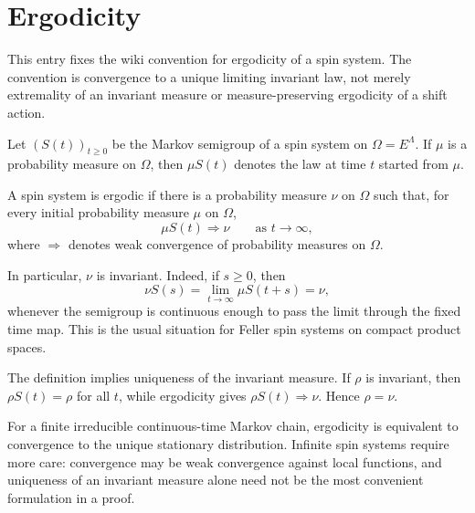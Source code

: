 
\section{Ergodicity}\label{ent:ergodicity}

This entry fixes the wiki convention for ergodicity of a spin system. The convention is convergence to a unique limiting invariant law, not merely extremality of an invariant measure or measure-preserving ergodicity of a shift action.


Let \((S(t))_{t\ge0}\) be the Markov semigroup of a spin system on \(\Omega=E^\Lambda\). If \(\mu\) is a probability measure on \(\Omega\), then \(\mu S(t)\) denotes the law at time \(t\) started from \(\mu\).

\begin{defn}[Ergodicity]\label{def:ergodicity}
A spin system is ergodic if there is a probability measure \(\nu\) on \(\Omega\) such that, for every initial probability measure \(\mu\) on \(\Omega\),
\[
    \mu S(t) \Rightarrow \nu
    \qquad\text{as }t\to\infty,
\]
where \(\Rightarrow\) denotes weak convergence of probability measures on \(\Omega\).
\end{defn}

In particular, \(\nu\) is invariant. Indeed, if \(s\ge0\), then
\[
    \nu S(s)
    =\lim_{t\to\infty} \mu S(t+s)
    =\nu,
\]
whenever the semigroup is continuous enough to pass the limit through the fixed time map. This is the usual situation for Feller spin systems on compact product spaces.

\begin{rem}[Uniqueness]\label{rem:ergodicity-uniqueness}
The definition implies uniqueness of the invariant measure. If \(\rho\) is invariant, then \(\rho S(t)=\rho\) for all \(t\), while ergodicity gives \(\rho S(t)\Rightarrow\nu\). Hence \(\rho=\nu\).
\end{rem}

\begin{rem}\label{rem:finite-infinite-ergodicity}
For a finite irreducible continuous-time Markov chain, ergodicity is equivalent to convergence to the unique stationary distribution. Infinite spin systems require more care: convergence may be weak convergence against local functions, and uniqueness of an invariant measure alone need not be the most convenient formulation in a proof.
\end{rem}


